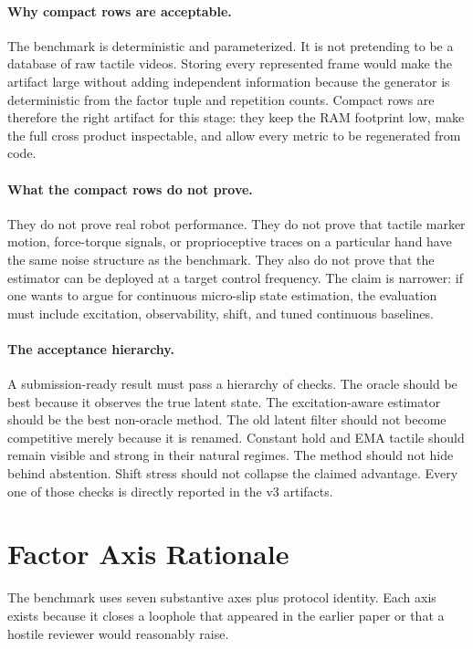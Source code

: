\documentclass{article}
\begin{document}
\paragraph{Why compact rows are acceptable.}
The benchmark is deterministic and parameterized. It is not pretending to be a database of raw tactile videos. Storing every represented frame would make the artifact large without adding independent information because the generator is deterministic from the factor tuple and repetition counts. Compact rows are therefore the right artifact for this stage: they keep the RAM footprint low, make the full cross product inspectable, and allow every metric to be regenerated from code.

\paragraph{What the compact rows do not prove.}
They do not prove real robot performance. They do not prove that tactile marker motion, force-torque signals, or proprioceptive traces on a particular hand have the same noise structure as the benchmark. They also do not prove that the estimator can be deployed at a target control frequency. The claim is narrower: if one wants to argue for continuous micro-slip state estimation, the evaluation must include excitation, observability, shift, and tuned continuous baselines.

\paragraph{The acceptance hierarchy.}
A submission-ready result must pass a hierarchy of checks. The oracle should be best because it observes the true latent state. The excitation-aware estimator should be the best non-oracle method. The old latent filter should not become competitive merely because it is renamed. Constant hold and EMA tactile should remain visible and strong in their natural regimes. The method should not hide behind abstention. Shift stress should not collapse the claimed advantage. Every one of those checks is directly reported in the v3 artifacts.

\section{Factor Axis Rationale}

The benchmark uses seven substantive axes plus protocol identity. Each axis exists because it closes a loophole that appeared in the earlier paper or that a hostile reviewer would reasonably raise.
\end{document}

